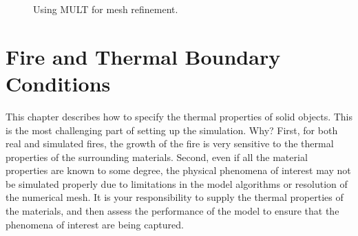 \documentclass[11pt]{book}
\begin{document}
\begin{figure}[h!]
\centering


\caption[Using {\ct MULT} for mesh refinement]{Using {\ct MULT} for mesh refinement.}
\label{fig:multmeshrefine}

\end{figure}


\chapter{Fire and Thermal Boundary Conditions}

This chapter describes how to specify the thermal properties of solid objects. This is
the most challenging part of setting up the simulation. Why?  First,
for both real and simulated fires, the growth of the fire is very
sensitive to the thermal properties of the surrounding
materials. Second, even if all the material properties are known to
some degree, the physical phenomena of interest may not be simulated
properly due to limitations in the model algorithms or resolution of
the numerical mesh. It is your responsibility to supply the thermal
properties of the materials, and then assess the performance of the
model to ensure that the phenomena of interest are being captured.
\end{document}
